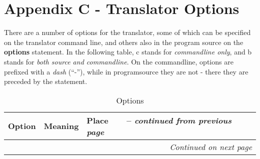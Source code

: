 \chapter{Appendix C - Translator Options}\label{optionstable}

There are a number of options for the translator, some of which can be
specified on the translator command line, and others also in the
program source on the \textbf{options} statement. In the following
table, c stands for \emph{commandline only}, and b stands for
\emph{both source and commandline}. On the commandline,
options are prefixed with a \emph{dash} (``-''), while in
programsource they are not - there they are preceded by the
 statement.
\begin{longtable}[l]{|l|p{10cm}|l|}
\caption{ Options } \\
\hline
\rowcolor[gray]{0.8} \bfseries Option & \bfseries Meaning & \bfseries Place   \
\endfirsthead
\multicolumn{3}{r}%
{{\tablename\ \thetable{} -- \emph{continued from previous page}}} \\
\endhead
\hline \multicolumn{3}{r}{\emph{Continued on next page}}
\endfoot


\end{longtable}
